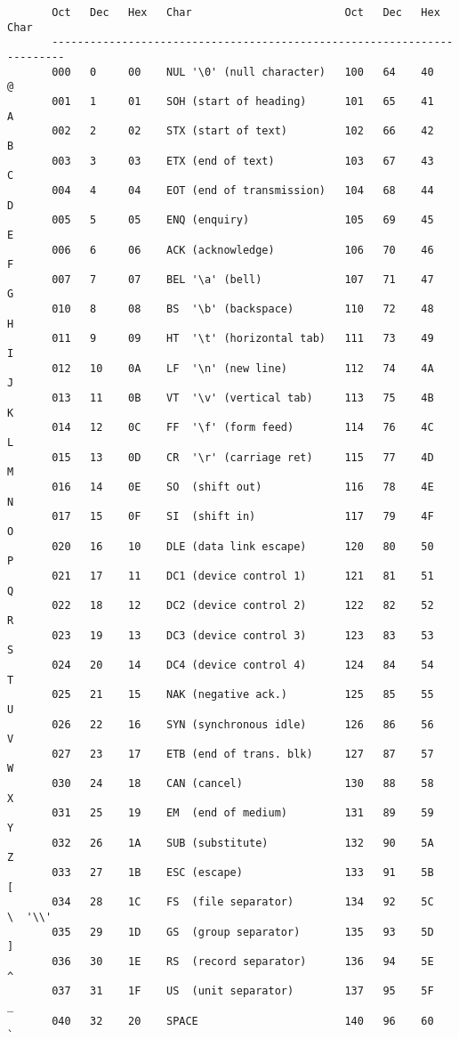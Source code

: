 \begin{verbatim}
       Oct   Dec   Hex   Char                        Oct   Dec   Hex   Char
       ------------------------------------------------------------------------
       000   0     00    NUL '\0' (null character)   100   64    40    @
       001   1     01    SOH (start of heading)      101   65    41    A
       002   2     02    STX (start of text)         102   66    42    B
       003   3     03    ETX (end of text)           103   67    43    C
       004   4     04    EOT (end of transmission)   104   68    44    D
       005   5     05    ENQ (enquiry)               105   69    45    E
       006   6     06    ACK (acknowledge)           106   70    46    F
       007   7     07    BEL '\a' (bell)             107   71    47    G
       010   8     08    BS  '\b' (backspace)        110   72    48    H
       011   9     09    HT  '\t' (horizontal tab)   111   73    49    I
       012   10    0A    LF  '\n' (new line)         112   74    4A    J
       013   11    0B    VT  '\v' (vertical tab)     113   75    4B    K
       014   12    0C    FF  '\f' (form feed)        114   76    4C    L
       015   13    0D    CR  '\r' (carriage ret)     115   77    4D    M
       016   14    0E    SO  (shift out)             116   78    4E    N
       017   15    0F    SI  (shift in)              117   79    4F    O
       020   16    10    DLE (data link escape)      120   80    50    P
       021   17    11    DC1 (device control 1)      121   81    51    Q
       022   18    12    DC2 (device control 2)      122   82    52    R
       023   19    13    DC3 (device control 3)      123   83    53    S
       024   20    14    DC4 (device control 4)      124   84    54    T
       025   21    15    NAK (negative ack.)         125   85    55    U
       026   22    16    SYN (synchronous idle)      126   86    56    V
       027   23    17    ETB (end of trans. blk)     127   87    57    W
       030   24    18    CAN (cancel)                130   88    58    X
       031   25    19    EM  (end of medium)         131   89    59    Y
       032   26    1A    SUB (substitute)            132   90    5A    Z
       033   27    1B    ESC (escape)                133   91    5B    [
       034   28    1C    FS  (file separator)        134   92    5C    \  '\\'
       035   29    1D    GS  (group separator)       135   93    5D    ]
       036   30    1E    RS  (record separator)      136   94    5E    ^
       037   31    1F    US  (unit separator)        137   95    5F    _
       040   32    20    SPACE                       140   96    60    `

\end{verbatim}

